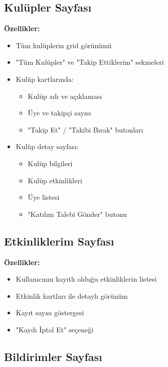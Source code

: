 \documentclass[a4paper,12pt]{report}
\begin{document}
\subsection{Kulüpler Sayfası}

\textbf{Özellikler:}
\begin{itemize}
    \item Tüm kulüplerin grid görünümü
    \item "Tüm Kulüpler" ve "Takip Ettiklerim" sekmeleri
    \item Kulüp kartlarında:
    \begin{itemize}
        \item Kulüp adı ve açıklaması
        \item Üye ve takipçi sayısı
        \item "Takip Et" / "Takibi Bırak" butonları
    \end{itemize}
    \item Kulüp detay sayfası:
    \begin{itemize}
        \item Kulüp bilgileri
        \item Kulüp etkinlikleri
        \item Üye listesi
        \item "Katılım Talebi Gönder" butonu
    \end{itemize}
\end{itemize}

\subsection{Etkinliklerim Sayfası}

\textbf{Özellikler:}
\begin{itemize}
    \item Kullanıcının kayıtlı olduğu etkinliklerin listesi
    \item Etkinlik kartları ile detaylı görünüm
    \item Kayıt sayısı göstergesi
    \item "Kaydı İptal Et" seçeneği
\end{itemize}

\subsection{Bildirimler Sayfası}
\end{document}
